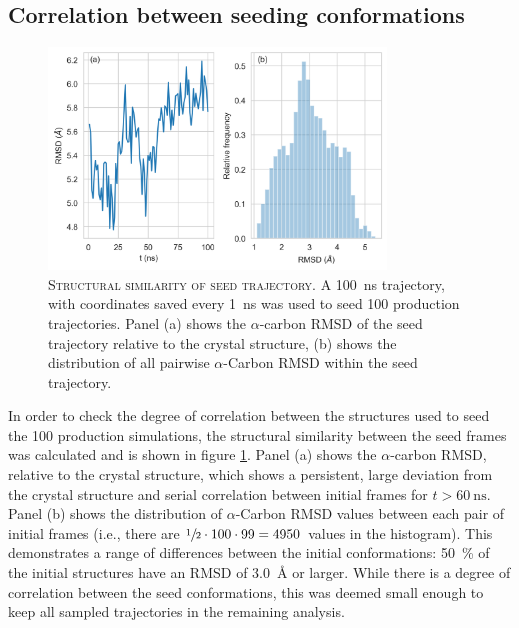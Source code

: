 \subsection{Correlation between seeding conformations}

\begin{figure}
    \centering
    \includegraphics[width=0.8\textwidth]{chapters/aadh/figures/rmsd_seed_trajectory.png}
    \caption[Structural similarity of seed trajectory]{\textsc{Structural similarity of seed trajectory}. A \SI{100}{\nano\second} trajectory, with coordinates saved every \SI{1}{\nano\second} was used to seed \num{100} production trajectories.  Panel (a) shows the $\alpha$-carbon RMSD of the seed trajectory relative to the crystal structure, (b) shows the distribution of all pairwise $\alpha$-Carbon RMSD within the seed trajectory. }
    \label{fig:rmsd_seed_traj}
\end{figure}


In order to check the degree of correlation between the structures used to seed the \num{100} production simulations, the structural similarity between the seed frames was calculated and is shown in figure \ref{fig:rmsd_seed_traj}. Panel (a) shows the $\alpha$-carbon RMSD, relative to the crystal structure, which shows a persistent, large deviation from the crystal structure and serial correlation between initial frames for $t>\SI{60}{\nano\second}$.  Panel (b) shows the distribution of $\alpha$-Carbon RMSD values between each pair of initial frames (i.e., there are $\sfrac{1}{2}\cdot 100\cdot 99 = 4950$ values in the histogram). This demonstrates a range of differences between the initial conformations: \SI{50}{\percent} of the initial structures have an RMSD of \SI{3.0}{\angstrom} or larger. While there is a degree of correlation between the seed conformations, this was deemed small enough to keep all sampled trajectories in the remaining analysis. 
 
